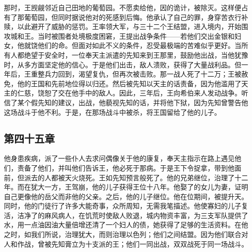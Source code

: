 那时，王觊觎邻近自己田地的葡萄园。不愿卖给他，因的诡计，被除灭。这样便占有了那葡萄园，但同时据说他对的死感到后悔。他承认了自己的罪，身穿苦衣行补赎，以此避开了威胁的惩罚。王率领大军，与三十二个王结盟，进入境内，开始围攻城和王。当时被围者处境极度困窘，王提出战争条件——若他们交出金银和妇女，他就饶他们的命。但面对如此不义的条件，忍受最极端的苦难似乎更好。当所有人都绝望于安全时，一位奉天主派遣的先知来到王那里，鼓励他出战，当他犹豫时，从多方面坚定他的信心。于是他们出击，敌人溃败，获得了大量战利品。但一年后，王重整兵力回到，渴望复仇，但再次被击败。那一战人死了十二万；王被赦免，他的王国和先前地位得以归还。然后被先知以天主的话责备，因为他滥用了天主的仁慈，饶恕了交在他手中的敌人。因此，三年后，王向希伯来人发动战争。听信了某个假先知的建议，出战，他藐视先知的话，并将他下狱，因为先知曾警告他这场战斗于他不利。于是，在那场战斗中被杀，将王国留给了他的儿子。\par


\subsection{第四十五章}

他身患疾病，派了一些仆人去求问偶像关于他的康复，奉天主指示在路上遇见他们，责备了他们，并叫他们告诉王，他必死于那病。于是王下令捉拿，带到他面前，但派去的人都被天火烧死。王如先知预言般死了。他的兄弟继位，治理了十二年。而在犹大一方，王驾崩，他的儿子获得王位十八年。他娶了的女儿为妻，证明自己更像他的岳父而非他的父亲。之后，他的儿子继位。他在位期间，被提升天。同时，他的门徒行了许多大能奇事，众所周知，无需我笔描述。他使寡妇的儿子复活，洁净了的麻风病人，在饥荒时使敌人败退，城内物资丰富，为三支军队提供了水，用一点油因油大量倍增还清了一个妇人的债，她获得了足够的生活资料。在他之时，如我们所说，治理犹大，而则治理以色列；他们之间结盟。因为他们联合对人和作战，曾被先知膏立为十支派的王；他们一同出战，双双战死于同一场战斗。\par

